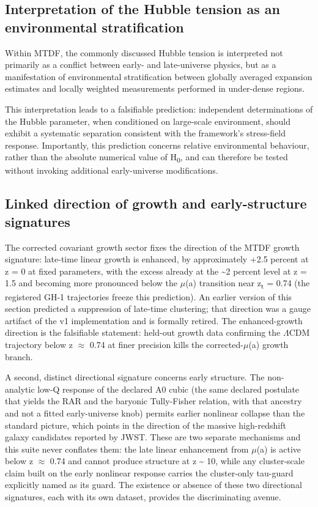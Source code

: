 \documentclass[11pt,a4paper]{article}
\begin{document}
\subsection{Interpretation of the Hubble tension as an environmental stratification}
Within MTDF, the commonly discussed Hubble tension is interpreted not primarily as a conflict between early- and late-universe physics, but as a manifestation of environmental stratification between globally averaged expansion estimates and locally weighted measurements performed in under-dense regions.

This interpretation leads to a falsifiable prediction: independent determinations of the Hubble parameter, when conditioned on large-scale environment, should exhibit a systematic separation consistent with the framework's stress-field response. Importantly, this prediction concerns relative environmental behaviour, rather than the absolute numerical value of H\textsubscript{0}, and can therefore be tested without invoking additional early-universe modifications.

\subsection{Linked direction of growth and early-structure signatures}
The corrected covariant growth sector fixes the direction of the MTDF growth signature: late-time linear growth is enhanced, by approximately +2.5 percent at z = 0 at fixed parameters, with the excess already at the \~{}2 percent level at z = 1.5 and becoming more pronounced below the $\mu$(a) transition near z\textsubscript{t} = 0.74 (the registered GH-1 trajectories freeze this prediction). An earlier version of this section predicted a suppression of late-time clustering; that direction was a gauge artifact of the v1 implementation and is formally retired. The enhanced-growth direction is the falsifiable statement: held-out growth data confirming the $\Lambda$CDM trajectory below z $\approx$ 0.74 at finer precision kills the corrected-$\mu$(a) growth branch.

A second, distinct directional signature concerns early structure. The non-analytic low-Q response of the declared A0 cubic (the same declared postulate that yields the RAR and the baryonic Tully-Fisher relation, with that ancestry and not a fitted early-universe knob) permits earlier nonlinear collapse than the standard picture, which points in the direction of the massive high-redshift galaxy candidates reported by JWST. These are two separate mechanisms and this suite never conflates them: the late linear enhancement from $\mu$(a) is active below z $\approx$ 0.74 and cannot produce structure at z \~{} 10, while any cluster-scale claim built on the early nonlinear response carries the cluster-only tau-guard explicitly named as its guard. The existence or absence of these two directional signatures, each with its own dataset, provides the discriminating avenue.
\end{document}
